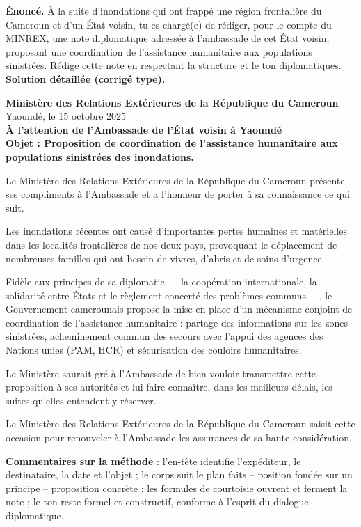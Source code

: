 \documentclass[11pt]{article}
\begin{document}
\begin{exoresolu}
\textbf{Énoncé.} À la suite d'inondations qui ont frappé une région frontalière du Cameroun et d'un État voisin, tu es chargé(e) de rédiger, pour le compte du MINREX, une note diplomatique adressée à l'ambassade de cet État voisin, proposant une coordination de l'assistance humanitaire aux populations sinistrées. Rédige cette note en respectant la structure et le ton diplomatiques.
\tcblower
\textbf{Solution détaillée (corrigé type).}

\textbf{Ministère des Relations Extérieures de la République du Cameroun}\\
Yaoundé, le 15 octobre 2025\\
\textbf{À l'attention de l'Ambassade de l'État voisin à Yaoundé}\\
\textbf{Objet : Proposition de coordination de l'assistance humanitaire aux populations sinistrées des inondations.}

Le Ministère des Relations Extérieures de la République du Cameroun présente ses compliments à l'Ambassade et a l'honneur de porter à sa connaissance ce qui suit.

Les inondations récentes ont causé d'importantes pertes humaines et matérielles dans les localités frontalières de nos deux pays, provoquant le déplacement de nombreuses familles qui ont besoin de vivres, d'abris et de soins d'urgence.

Fidèle aux principes de sa diplomatie — la coopération internationale, la solidarité entre États et le règlement concerté des problèmes communs —, le Gouvernement camerounais propose la mise en place d'un mécanisme conjoint de coordination de l'assistance humanitaire : partage des informations sur les zones sinistrées, acheminement commun des secours avec l'appui des agences des Nations unies (PAM, HCR) et sécurisation des couloirs humanitaires.

Le Ministère saurait gré à l'Ambassade de bien vouloir transmettre cette proposition à ses autorités et lui faire connaître, dans les meilleurs délais, les suites qu'elles entendent y réserver.

Le Ministère des Relations Extérieures de la République du Cameroun saisit cette occasion pour renouveler à l'Ambassade les assurances de sa haute considération.

\textbf{Commentaires sur la méthode} : l'en-tête identifie l'expéditeur, le destinataire, la date et l'objet ; le corps suit le plan faits -- position fondée sur un principe -- proposition concrète ; les formules de courtoisie ouvrent et ferment la note ; le ton reste formel et constructif, conforme à l'esprit du dialogue diplomatique.
\end{exoresolu}
\end{document}
